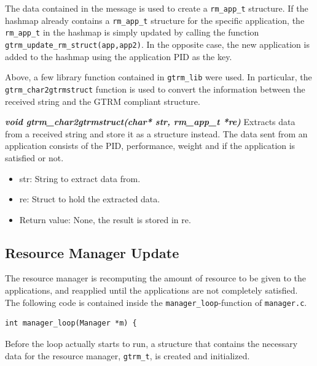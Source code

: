 \documentclass[nobiblatex]{LTHthesis}
\begin{document}
The data contained in the message is used to create a \texttt{rm\_app\_t}
structure. If the hashmap already contains a \texttt{rm\_app\_t} structure 
for the specific application, the \texttt{rm\_app\_t} in the hashmap is
simply updated by calling the function 
\texttt{gtrm\_update\_rm\_struct(app,app2)}. In the opposite case, the new
application is added to the hashmap using the application PID as the key.

Above, a few library function contained in \texttt{gtrm\_lib} were used.
In particular, the \texttt{gtrm\_char2gtrmstruct} function is used to
convert the information between the received string and the GTRM
compliant structure.
\begin{framed}
	\begin{flushleft}
		\textbf{\emph{void gtrm\_char2gtrmstruct(char* str, rm\_app\_t *re)}}
		Extracts data from a received string and store it as a structure 
    instead. The data sent from an application consists of the PID,
    performance, weight and if the application is satisfied or not.
		\begin{itemize} 
		\item str: String to extract data from.
		\item re: Struct to hold the extracted data.
		\item Return value: None, the result is stored in re.
		\end{itemize}
	\end{flushleft}	
\end{framed}

\subsection{Resource Manager Update}
The resource manager is recomputing the amount of resource to be given to
the applications, and reapplied until the applications are not completely
satisfied. The following code is contained inside the 
\texttt{manager\_loop}-function of \texttt{manager.c}.

\begin{lstlisting}
int manager_loop(Manager *m) {
\end{lstlisting}

Before the loop actually starts to run, a structure that contains the
necessary data for the resource manager, \texttt{gtrm\_t}, is created 
and initialized.
\end{document}
